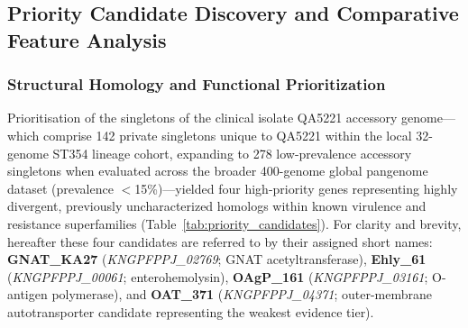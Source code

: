 \documentclass[pdflatex,sn-mathphys-num]{sn-jnl}
\begin{document}
\subsection{Priority Candidate Discovery and Comparative Feature Analysis}

\subsubsection{Structural Homology and Functional Prioritization}
Prioritisation of the singletons of the clinical isolate QA5221 accessory genome—which comprise 142 private singletons unique to QA5221 within the local 32-genome ST354 lineage cohort, expanding to 278 low-prevalence accessory singletons when evaluated across the broader 400-genome global pangenome dataset (prevalence $<$15\%)—yielded four high-priority genes representing highly divergent, previously uncharacterized homologs within known virulence and resistance superfamilies (Table~\ref{tab:priority_candidates}). For clarity and brevity, hereafter these four candidates are referred to by their assigned short names: \textbf{GNAT\_KA27} (\textit{KNGPFPPJ\_02769}; GNAT acetyltransferase), \textbf{Ehly\_61} (\textit{KNGPFPPJ\_00061}; enterohemolysin), \textbf{OAgP\_161} (\textit{KNGPFPPJ\_03161}; O-antigen polymerase), and \textbf{OAT\_371} (\textit{KNGPFPPJ\_04371}; outer-membrane autotransporter candidate representing the weakest evidence tier). 
\end{document}

